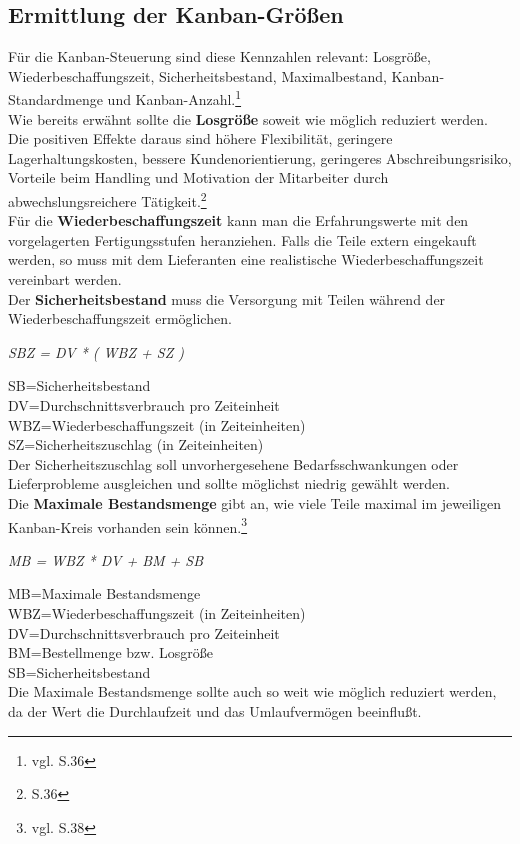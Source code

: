 \subsection{Ermittlung der Kanban-Größen}
Für die Kanban-Steuerung sind diese Kennzahlen relevant: Losgröße, Wiederbeschaffungszeit, 
Sicherheitsbestand, Maximalbestand, Kanban-Standardmenge und Kanban-Anzahl.\footnote{vgl. \cite{Geiger2011Kanban} S.36}\\

Wie bereits erwähnt sollte die \textbf{Losgröße} soweit wie möglich reduziert werden. Die positiven Effekte daraus sind  
höhere Flexibilität, geringere Lagerhaltungskosten, bessere Kundenorientierung, 
geringeres Abschreibungsrisiko, Vorteile beim Handling und Motivation der Mitarbeiter durch 
abwechslungsreichere Tätigkeit.\footnote{\cite{Geiger2011Kanban} S.36}\\

Für die \textbf{Wiederbeschaffungszeit} kann man die Erfahrungswerte mit den vorgelagerten Fertigungsstufen heranziehen.
Falls die Teile extern eingekauft werden, so muss mit dem Lieferanten eine realistische Wiederbeschaffungszeit vereinbart werden.\\

Der \textbf{Sicherheitsbestand} muss die Versorgung mit Teilen während der Wiederbeschaffungszeit ermöglichen.\\
\centerline{\textit{SBZ = DV * ( WBZ + SZ )}}
SB=Sicherheitsbestand\\
DV=Durchschnittsverbrauch pro Zeiteinheit\\
WBZ=Wiederbeschaffungszeit (in Zeiteinheiten)\\
SZ=Sicherheitszuschlag (in Zeiteinheiten)\\
Der Sicherheitszuschlag soll unvorhergesehene Bedarfsschwankungen oder Lieferprobleme
ausgleichen und sollte möglichst niedrig gewählt werden.\\

Die \textbf{Maximale Bestandsmenge} gibt an, wie viele Teile maximal im jeweiligen Kanban-Kreis vorhanden sein können.\footnote{vgl. \cite{Geiger2011Kanban} S.38}

\centerline{\textit{MB = WBZ * DV + BM + SB}}
 MB=Maximale Bestandsmenge\\
 WBZ=Wiederbeschaffungszeit (in Zeiteinheiten)\\
 DV=Durchschnittsverbrauch pro Zeiteinheit\\
 BM=Bestellmenge bzw. Losgröße\\
 SB=Sicherheitsbestand\\
Die Maximale Bestandsmenge sollte auch so weit wie möglich reduziert werden, da der Wert die Durchlaufzeit und das Umlaufvermögen beeinflußt.\\

